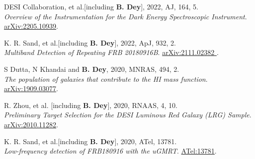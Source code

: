 \begin{etaremune}[leftmargin=40pt,labelsep=10pt]
 \item DESI Collaboration, et al.[including \textbf{B. Dey}], 2022, AJ, 164, 5. \\ \textrm{\textit{Overview of the Instrumentation for the Dark Energy Spectroscopic Instrument}}. \href{https://arxiv.org/abs/2205.10939}{arXiv:2205.10939}.
 
\item K. R. Sand, et al.[including \textbf{B. Dey}], 2022, ApJ, 932, 2. \\ \textrm{\textit{Multiband Detection of Repeating FRB 20180916B}}. \href{https://arxiv.org/abs/2111.02382}{arXiv:2111.02382 }.

\item S Dutta, N Khandai and \textbf{B. Dey}, 2020, MNRAS, 494, 2. \\ \textrm{\textit{The population of galaxies that contribute to the HI mass function}}. \href{https://arxiv.org/abs/1909.03077}{arXiv:1909.03077}.

\item R. Zhou, et al. [including \textbf{B. Dey}], 2020, RNAAS, 4, 10. \\ \textrm{\textit{Preliminary Target Selection for the DESI Luminous Red Galaxy (LRG) Sample}}. \href{https://arxiv.org/abs/2010.11282}{arXiv:2010.11282}.

\item K. R. Sand, et al.[including \textbf{B. Dey}], 2020, ATel, 13781. \\ \textrm{\textit{Low-frequency detection of FRB180916 with the uGMRT}}. \href{https://www.astronomerstelegram.org/?read=13781}{ATel:13781}.
\end{etaremune} 



